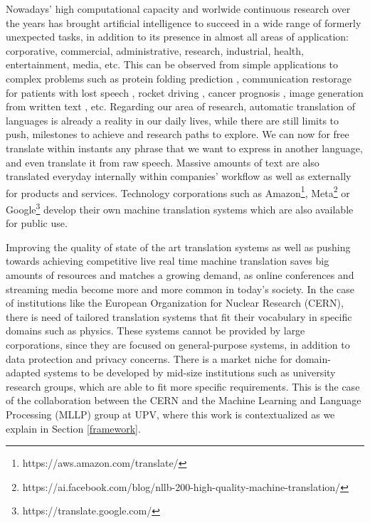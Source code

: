 \documentclass[11pt,english,listoffigures,listoftables]{tfgetsinf}
\begin{document}
Nowadays' high computational capacity and worlwide continuous research over the years has brought artificial intelligence to succeed in a wide range of formerly unexpected tasks, in addition to its presence in almost all areas of application: corporative, commercial, administrative, research, industrial, health, entertainment, media, etc. This can be observed from simple applications to complex problems such as protein folding prediction \cite{Jumper2021HighlyAP}, communication restorage for patients with lost speech \cite{Willett2020.07.01.183384}, rocket driving \cite{https://doi.org/10.48550/arxiv.2102.07109}, cancer prognosis \cite{doi:10.1177/117693510600200030}, image generation from written text \cite{https://doi.org/10.48550/arxiv.2204.06125}, etc. Regarding our area of research, automatic translation of languages is already a reality in our daily lives, while there are still limits to push, milestones to achieve and research paths to explore. We can now for free translate within instants any phrase that we want to express in another language, and even translate it from raw speech. Massive amounts of text are also translated everyday internally within companies' workflow as well as externally for products and services. Technology corporations such as Amazon\footnote{https://aws.amazon.com/translate/}, Meta\footnote{https://ai.facebook.com/blog/nllb-200-high-quality-machine-translation/} or Google\footnote{https://translate.google.com/} develop their own machine translation systems which are also available for public use.

Improving the quality of state of the art translation systems as well as pushing towards achieving competitive live real time machine translation saves big amounts of resources and matches a growing demand, as online conferences and streaming media become more and more common in today's society. In the case of institutions like the European Organization for Nuclear Research (CERN), there is need of tailored translation systems that fit their vocabulary in specific domains such as physics. These systems cannot be provided by large corporations, since they are focused on general-purpose systems, in addition to data protection and privacy concerns. There is a market niche for domain-adapted systems to be developed by mid-size institutions such as university research groups, which are able to fit more specific requirements. This is the case of the collaboration between the CERN and the Machine Learning and Language Processing (MLLP) group at UPV, where this work is contextualized as we explain in Section \ref{framework}.
\end{document}
